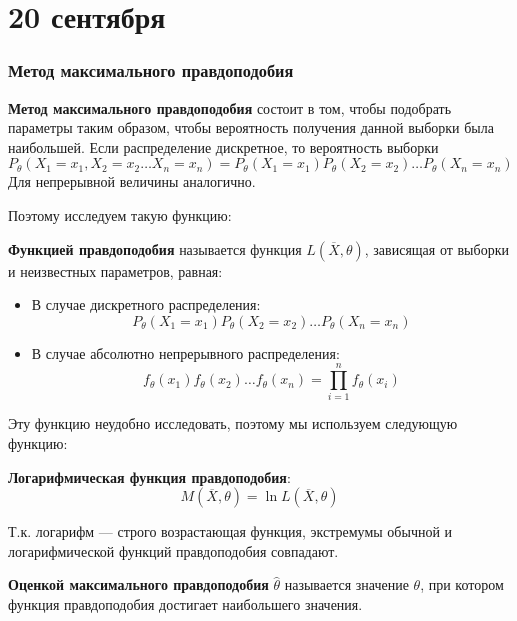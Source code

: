 \chapter{20 сентября}

\subsection{Метод максимального правдоподобия}

\textbf{Метод максимального правдоподобия} состоит в том, чтобы подобрать параметры таким образом, чтобы вероятность получения данной выборки была наибольшей. Если распределение дискретное, то вероятность выборки
\[P_\theta(X_1 = x_1, X_2 = x_2 \dots X_n = x_n) = P_\theta(X_1 = x_1) P_\theta(X_2 = x_2) \dots P_\theta(X_n = x_n)\]
Для непрерывной величины аналогично.

Поэтому исследуем такую функцию:
\begin{definition}
    \textbf{Функцией правдоподобия} называется функция \(L(\overline{X}, \theta)\), зависящая от выборки и неизвестных параметров, равная:
    \begin{itemize}
        \item В случае дискретного распределения:
              \[P_\theta(X_1 = x_1) P_\theta(X_2 = x_2) \dots P_\theta(X_n = x_n)\]
        \item В случае абсолютно непрерывного распределения:
              \[f_\theta(x_1) f_\theta(x_2) \dots f_\theta(x_n) = \prod_{i=1}^{n} f_\theta(x_i)\]
    \end{itemize}
\end{definition}

Эту функцию неудобно исследовать, поэтому мы используем следующую функцию:
\begin{definition}
    \textbf{Логарифмическая функция правдоподобия}:
    \[M(\overline{X}, \theta) = \ln L(\overline{X}, \theta)\]
\end{definition}

Т.к. логарифм --- строго возрастающая функция, экстремумы обычной и логарифмической функций правдоподобия совпадают.

\begin{definition}
    \textbf{Оценкой максимального правдоподобия} \(\hat{\theta}\) называется значение \(\theta\), при котором функция правдоподобия достигает наибольшего значения.
\end{definition}

